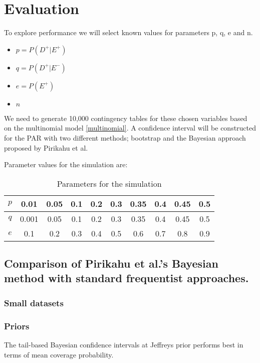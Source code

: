 \chapter{Evaluation} \label{sec:Evaluation}

To explore performance we will select known values for parameters p, q, e and n. 
\begin{itemize}
    \item $p = P(D^+ |E^+)$
    \item $q = P(D^+ |E^-)$
    \item $e = P(E^+)$
    \item $n$
\end{itemize}

We need to generate 10,000 contingency tables for these chosen variables based on the multinomial model \ref{multinomial}. A confidence interval will be constructed for the PAR with two different methods; bootstrap and the Bayesian approach proposed by Pirikahu et al.

Parameter values for the simulation are:
\begin{table}[h!]
    \centering
    \caption{Parameters for the simulation}
    \label{sample-parameters}
    \begin{tabular}{|c|c|c|c|c|c|c|c|c|c|}
    \hline
    $p$ & 0.01 & 0.05 & 0.1 & 0.2 & 0.3 & 0.35 & 0.4 & 0.45 & 0.5 \\ \hline
    $q$ & 0.001 & 0.05 & 0.1 & 0.2 & 0.3 & 0.35 & 0.4 & 0.45 & 0.5 \\ \hline
    $e$ & 0.1 & 0.2 & 0.3 & 0.4 & 0.5 & 0.6 & 0.7 & 0.8 & 0.9 \\ \hline
    \end{tabular}
    \end{table}

\section{Comparison of Pirikahu et al.'s Bayesian method with standard frequentist approaches.}

\subsection{Small datasets}

\subsection{Priors}
The tail-based Bayesian confidence intervals at Jeffreys prior performs
best in terms of mean coverage probability. \cite{Shi2009BayesianCI} 
